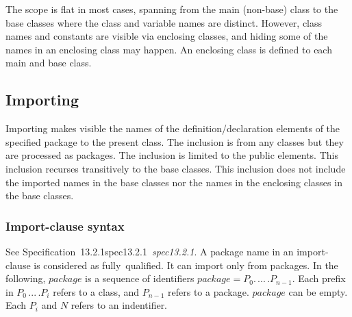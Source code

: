 \documentclass[10pt,b5paper]{article}
\def\specrefx#1#2{Specification~#1\ifx\relax#2\relax{}\else~{\it{}#2}\fi}
\def\specref#1{\specrefx{#1}{\csname spec#1\endcsname}}
\begin{document}
The scope is flat in most cases, spanning from the main (non-base)
class to the base classes where the class and variable names are
distinct.  However, class names and constants are visible via
enclosing classes, and hiding some of the names in an enclosing class
may happen.  An enclosing class is defined to each main and base
class.


\subsection{Importing}

\def\baseofbase{This inclusion recurses transitively to the base
classes}

\def\noimport{This inclusion does not include the imported names in
the base classes nor the names in the enclosing classes in the base
classes}

Importing makes visible the names of the definition/declaration
elements of the specified package to the present class.  The inclusion
is from any classes but they are processed as packages.  The inclusion
is limited to the public elements. \baseofbase. \noimport.

\subsubsection*{Import-clause syntax}

\def\packagenames{P_0.\,...\,.P_{n-1}}

See \specref{13.2.1}.  A package name in an import-clause is
considered as fully~qualified.  It can import only from packages.  In
the following, $\mathit{package}$ is a sequence of identifiers
$\mathit{package}=\packagenames$.  Each prefix in $P_0\,...\,.P_i$
refers to a class, and $P_{n-1}$ refers to a package.
$\mathit{package}$ can be empty.  Each $P_i$ and $N$ refers to an
indentifier.
\end{document}
